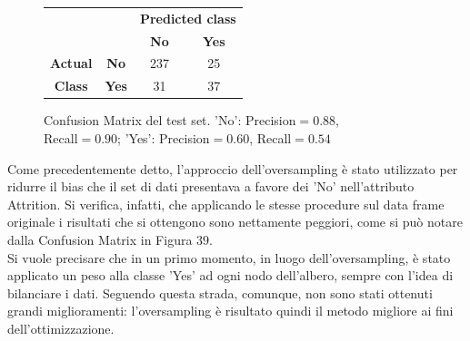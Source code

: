 \documentclass[a4paper,9pt]{article}
\begin{document}
\begin{figure}[H]
    \centering
\begin{tabular}{cc|cc}
\toprule
&\bfseries      & \multicolumn{2}{c}{\bfseries Predicted class} \\
& & \bfseries No & \bfseries Yes \\
\midrule
\bfseries Actual&\bfseries No  & 237 & 25  \\
\bfseries Class &\bfseries Yes & 31 & 37  \\
\bottomrule
\end{tabular}
\caption{Confusion Matrix del test set. 'No': Precision$=0.88$,\\ \qquad \qquad Recall$=0.90$; 'Yes': Precision$=0.60$, Recall$=0.54$}
\end{figure}

Come precedentemente detto, l'approccio dell'oversampling è stato utilizzato per ridurre il bias che il set di dati presentava a favore dei 'No' nell'attributo Attrition. Si verifica, infatti, che applicando le stesse procedure sul data frame originale i risultati che si ottengono sono nettamente peggiori, come si può notare dalla Confusion Matrix in Figura $39$. \\ Si vuole precisare che in un primo momento, in luogo dell'oversampling, è stato applicato un peso alla classe 'Yes' ad ogni nodo dell'albero, sempre con l'idea di bilanciare i dati. Seguendo questa strada, comunque, non sono stati ottenuti grandi miglioramenti: l'oversampling è risultato quindi il metodo migliore ai fini dell'ottimizzazione.
\end{document}

